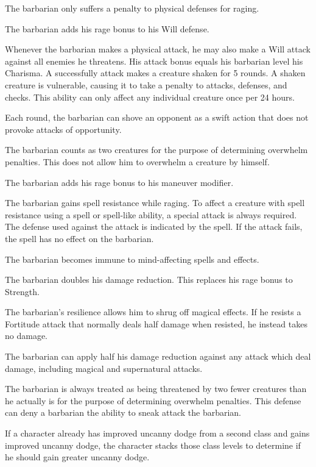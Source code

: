  The barbarian only suffers a  penalty to physical defenses for raging.

 The barbarian adds his rage bonus to his Will defense.

 Whenever the barbarian makes a physical attack, he may also make a Will attack against all enemies he threatens. His attack bonus equals his barbarian level \add his Charisma. A successfully attack makes a creature shaken for 5 rounds. A shaken creature is vulnerable, causing it to take a  penalty to attacks, defenses, and checks. This ability can only affect any individual creature once per 24 hours.

 Each round, the barbarian can shove an opponent as a swift action that does not provoke attacks of opportunity.

 The barbarian counts as two creatures for the purpose of determining overwhelm penalties. This does not allow him to overwhelm a creature by himself.

 The barbarian adds his rage bonus to his maneuver modifier.

 The barbarian gains spell resistance while raging. To affect a creature with spell resistance using a spell or spell-like ability, a special attack is always required. The defense used against the attack is indicated by the spell. If the attack fails, the spell has no effect on the barbarian.

 The barbarian becomes immune to mind-affecting spells and effects.

 The barbarian doubles his damage reduction. This replaces his rage bonus to Strength.

 The barbarian's resilience allows him to shrug off magical effects. If he resists a Fortitude attack that normally deals half damage when resisted, he instead takes no damage.

 The barbarian can apply half his damage reduction against any attack which deal damage, including magical and supernatural attacks.

 The barbarian is always treated as being threatened by two fewer creatures than he actually is for the purpose of determining overwhelm penalties. This defense can deny a barbarian the ability to sneak attack the barbarian.
\par If a character already has improved uncanny dodge from a second class and gains improved uncanny dodge, the character stacks those class levels to determine if he should gain greater uncanny dodge.

